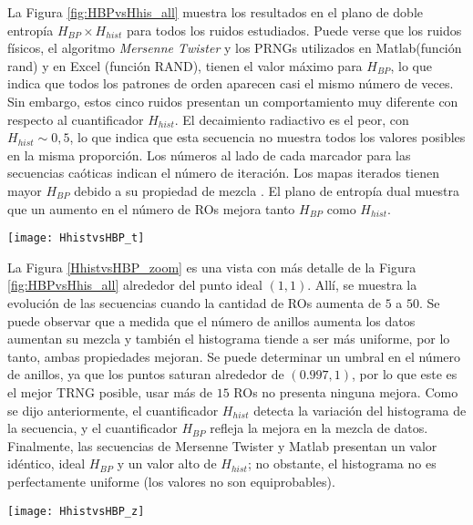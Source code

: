 La Figura \ref{fig:HBPvsHhis_all} muestra los resultados en el plano de doble entropía $H_ {BP} \times H_{hist}$ para todos los ruidos estudiados.
Puede verse que los ruidos físicos, el algoritmo \emph{Mersenne Twister} y los {PRNG}s utilizados en {Matlab}(función {rand}) y en {Excel} (función {RAND}), tienen el valor máximo para $H_{BP}$, lo que indica que todos los patrones de orden aparecen casi el mismo número de veces.
Sin embargo, estos cinco ruidos presentan un comportamiento muy diferente con respecto al cuantificador $H_{hist}$.
El {decaimiento radiactivo} es el peor, con $H_ {hist} \sim 0,5$, lo que indica que esta secuencia no muestra todos los valores posibles en la misma proporción.
Los números al lado de cada marcador para las secuencias caóticas indican el número de iteración.
Los mapas iterados tienen mayor $H_{BP}$ debido a su propiedad de mezcla \cite{DeMicco2008}.
El plano de entropía dual muestra que un aumento en el número de {RO}s mejora tanto $H_{BP}$ como $H_{hist}$.
%
\begin{figure*}
\begin{center}
\texttt{[image: HhistvsHBP\_t]}
\caption{Plano $H_{hist} \times H_{BP}$ para distintos RNGs. Los números que siguen a cada cuadrado indica la cantidad de {RO}s utilizado en cada {TRNG}.
Los números al lado de cada punto en los resultados de los mapas {Logístico} y {TWBM} indican el número de iteración.}
\label{fig:HBPvsHhis_all}
\end{center}
\end{figure*}

La Figura \ref{HhistvsHBP_zoom} es una vista con más detalle de la Figura \ref{fig:HBPvsHhis_all} alrededor del punto ideal $(1,1)$.
Allí, se muestra la evolución de las secuencias cuando la cantidad de {RO}s aumenta de $5$ a $50$.
Se puede observar que a medida que el número de anillos aumenta los datos aumentan su mezcla y también el histograma tiende a ser más uniforme, por lo tanto, ambas propiedades mejoran.
Se puede determinar un umbral en el número de anillos, ya que los puntos saturan alrededor de $(0.997,1)$, por lo que este es el mejor {TRNG} posible, usar más de $15$ {RO}s no presenta ninguna mejora.
Como se dijo anteriormente, el cuantificador $H_ {hist}$ detecta la variación del histograma de la secuencia, y el cuantificador $ H_ {BP} $ refleja la mejora en la mezcla de datos.
Finalmente, las secuencias de Mersenne Twister y Matlab presentan un valor idéntico, ideal $H_ {BP}$ y un valor alto de $H_ {hist}$; no obstante, el histograma no es perfectamente uniforme (los valores no son equiprobables).
%
\begin{figure*}
	\begin{center}
		\texttt{[image: HhistvsHBP\_z]}
		\caption{Detalle de la Figura \ref{fig:HBPvsHhis_all} alrededor del punto ideal $(1,1)$.}
		\label{HhistvsHBP_zoom}
	\end{center}
\end{figure*}